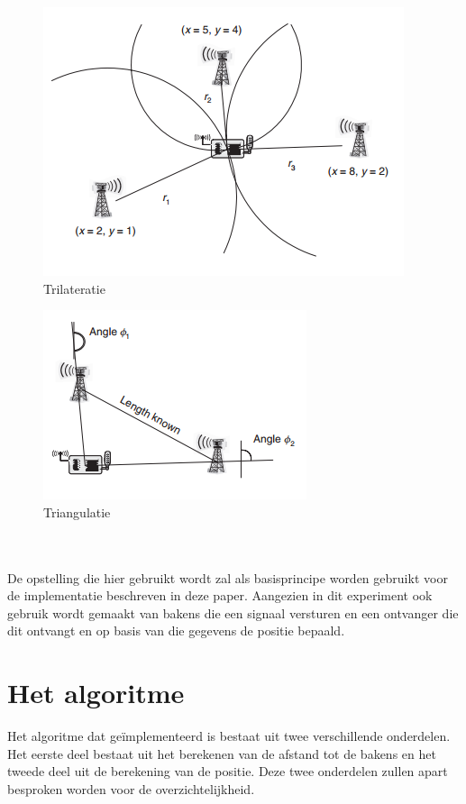 \documentclass{article}
\begin{document}
\begin{figure}[h]
\centering\includegraphics[scale=0.75]{trilateratie.png}
\caption{Trilateratie \cite{h9}}
\label{trilateratie}
\end{figure}
\begin{figure}[h]
\centering\includegraphics[scale=0.75]{triangulatie.png}
\caption{Triangulatie \cite{h9}}
\label{triangulatie}
\end{figure}\\
\\
De opstelling die hier gebruikt wordt zal als basisprincipe worden gebruikt voor de implementatie beschreven in deze paper. Aangezien in dit experiment ook gebruik wordt gemaakt van bakens die een signaal versturen en een ontvanger die dit ontvangt en op basis van die gegevens de positie bepaald. 

\section{Het algoritme}
Het algoritme dat ge\"{i}mplementeerd is bestaat uit twee verschillende onderdelen. Het eerste deel bestaat uit het berekenen van de afstand tot de bakens en het tweede deel uit de berekening van de positie. Deze twee onderdelen zullen apart besproken worden voor de overzichtelijkheid.
	
\end{document}
